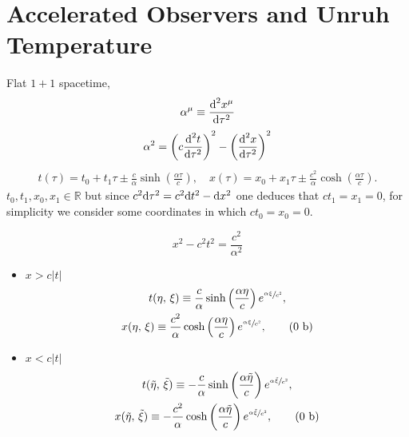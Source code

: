 \section{Accelerated Observers and Unruh Temperature}
Flat $1+1$ spacetime, 
\begin{equation}
	\alpha^\mu\equiv\frac{\text{d}^2x^\mu}{\text{d}\tau^2}
\end{equation}
\begin{equation}
	\alpha^2=\left(c\frac{\text{d}^2 t}{\text{d}\tau^2}\right)^2-\left(\frac{\text{d}^2x}{\text{d}\tau^2}\right)^2
\end{equation}
\begin{subequations}
	\begin{gather}
		t(\tau)=t_0+t_1\tau\pm\frac{c}{\alpha}\sinh\left(\frac{\alpha\tau}{c}\right),\quad x(\tau)=x_0+x_1\tau\pm\frac{c^2}{\alpha}\cosh\left(\frac{\alpha\tau}{c}\right).\tag{\theequation \,\,a,b}
	\end{gather}
\end{subequations}
$t_0,t_1,x_0,x_1\in\mathbb{R}$ but since $c^2\text{d}\tau^2=c^2\text{d} t^2-\text{d} x^2$ one deduces that $ct_1=x_1=0$, for simplicity we consider some coordinates in which $ct_0=x_0=0$.

\begin{equation}
	x^2-c^2t^2=\frac{c^2}{\alpha^2}
\end{equation}
\begin{wrapfigure}{r}{0.4\textwidth}
\end{wrapfigure}
\begin{itemize}
	\item $x>c|t|$
	\begin{subequations}
		\begin{gather}
			t(\eta,\,\xi)\equiv \frac{c}{\alpha}\sinh\left(\frac{\alpha\eta}{c}\right)e^{\sfrac{\alpha\xi}{c^2}},\\ x(\eta,\,\xi)\equiv \frac{c^2}{\alpha}\cosh\left(\frac{\alpha\eta}{c}\right)e^{\sfrac{\alpha\xi}{c^2}},\tag{\theequation \,\,b}
		\end{gather}
	\end{subequations}
	\item $x<c|t|$
	\begin{subequations}
		\begin{gather}
			t(\tilde\eta,\,\tilde\xi)\equiv- \frac{c}{\alpha}\sinh\left(\frac{\alpha\tilde\eta}{c}\right)e^{\sfrac{\alpha\tilde\xi}{c^2}},\\ x(\tilde\eta,\,\tilde\xi)\equiv -\frac{c^2}{\alpha}\cosh\left(\frac{\alpha\tilde\eta}{c}\right)e^{\sfrac{\alpha\tilde\xi}{c^2}},\tag{\theequation \,\,b}
		\end{gather}
	\end{subequations}
\end{itemize}


